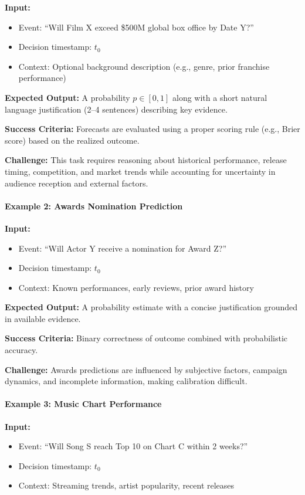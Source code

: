 \documentclass{article} %
\begin{document}
\textbf{Input:}
\begin{itemize}[noitemsep]
    \item Event: ``Will Film X exceed \$500M global box office by Date Y?''
    \item Decision timestamp: $t_0$
    \item Context: Optional background description (e.g., genre, prior franchise performance)
\end{itemize}

\textbf{Expected Output:}
A probability $p \in [0,1]$ along with a short natural language justification (2--4 sentences) describing key evidence.

\textbf{Success Criteria:}
Forecasts are evaluated using a proper scoring rule (e.g., Brier score) based on the realized outcome.

\textbf{Challenge:}
This task requires reasoning about historical performance, release timing, competition, and market trends while accounting for uncertainty in audience reception and external factors.

\paragraph{Example 2: Awards Nomination Prediction}

\textbf{Input:}
\begin{itemize}[noitemsep]
    \item Event: ``Will Actor Y receive a nomination for Award Z?''
    \item Decision timestamp: $t_0$
    \item Context: Known performances, early reviews, prior award history
\end{itemize}

\textbf{Expected Output:}
A probability estimate with a concise justification grounded in available evidence.

\textbf{Success Criteria:}
Binary correctness of outcome combined with probabilistic accuracy.

\textbf{Challenge:}
Awards predictions are influenced by subjective factors, campaign dynamics, and incomplete information, making calibration difficult.

\paragraph{Example 3: Music Chart Performance}

\textbf{Input:}
\begin{itemize}[noitemsep]
    \item Event: ``Will Song S reach Top 10 on Chart C within 2 weeks?''
    \item Decision timestamp: $t_0$
    \item Context: Streaming trends, artist popularity, recent releases
\end{itemize}
\end{document}
